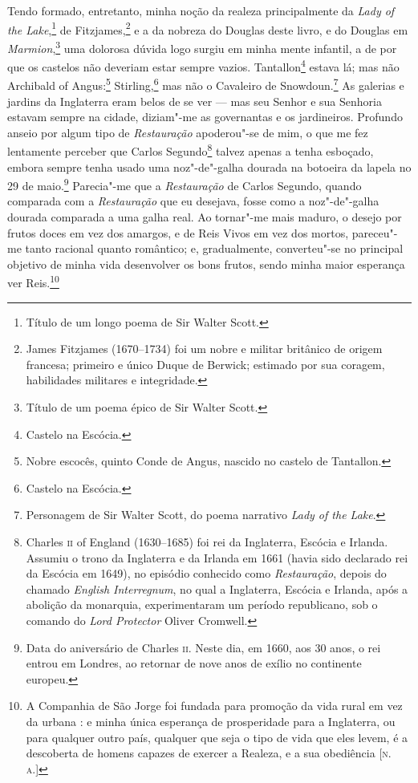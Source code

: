 Tendo formado, entretanto, minha noção da realeza principalmente da
\textit{Lady of the Lake},\footnote{Título de um longo poema de Sir Walter
  Scott.} de Fitzjames,\footnote{James Fitzjames
  (1670--1734) foi um nobre e militar britânico de origem francesa; primeiro e único Duque de Berwick; estimado por sua coragem, habilidades militares e
  integridade.} e a da nobreza do Douglas deste livro, e
do Douglas em \textit{Marmion},\footnote{Título de um poema épico de Sir
  Walter Scott.} uma dolorosa dúvida logo surgiu
em minha mente infantil, a de por que os castelos não deveriam estar
sempre vazios. Tantallon\footnote{Castelo na Escócia.}
estava lá; mas não Archibald of Angus:\footnote{Nobre escocês, quinto Conde
  de Angus, nascido no castelo de Tantallon.}
Stirling,\footnote{Castelo na Escócia.} mas não o
Cavaleiro de Snowdoun.\footnote{Personagem de Sir Walter Scott, do poema
  narrativo \textit{Lady of the Lake}.} As galerias e
jardins da Inglaterra eram belos de se ver --- mas seu Senhor e sua
Senhoria estavam sempre na cidade, diziam"-me as governantas e os
jardineiros. Profundo anseio por algum tipo de \textit{Restauração}
apoderou"-se de mim, o que me fez lentamente perceber que Carlos
Segundo\footnote{Charles \textsc{ii} of England (1630--1685) foi rei da Inglaterra, Escócia e Irlanda. Assumiu o trono da Inglaterra e da Irlanda em 1661
  (havia sido declarado rei da Escócia em 1649), no episódio conhecido
  como \textit{Restauração}, depois do chamado \textit{English Interregnum}, no
  qual a Inglaterra, Escócia e Irlanda, após a abolição da monarquia,
  experimentaram um período republicano, sob o comando do \textit{Lord
  Protector} Oliver Cromwell.} talvez apenas a tenha esboçado, embora
sempre tenha usado uma noz"-de"-galha dourada na botoeira da lapela no 29
de maio.\footnote{Data do aniversário de Charles \textsc{ii}. Neste dia, em 1660,
  aos 30 anos, o rei entrou em Londres, ao retornar de nove anos de
  exílio no continente europeu.} Parecia"-me que a
\textit{Restauração} de Carlos Segundo, quando comparada com a \textit{Restauração} que eu desejava, fosse como a noz"-de"-galha dourada comparada a uma galha real.
Ao tornar"-me mais maduro, o desejo por frutos doces em vez dos amargos,
e de Reis Vivos em vez dos mortos, pareceu"-me tanto racional quanto
romântico; e, gradualmente, converteu"-se no principal objetivo de minha
vida desenvolver os bons frutos, sendo minha maior esperança ver
Reis.\footnote{A Companhia de São Jorge foi fundada para promoção da vida
  rural em vez da urbana : e minha única esperança de prosperidade para
  a Inglaterra, ou para qualquer outro país, qualquer que seja o tipo de
  vida que eles levem, é a descoberta de homens capazes de exercer a
  Realeza, e a sua obediência {[}\textsc{n.\,a.}{]}}

